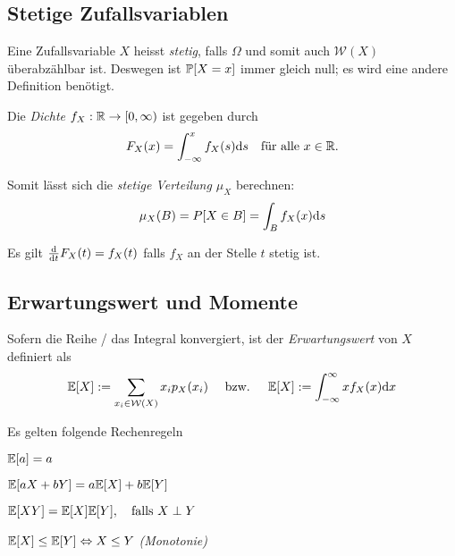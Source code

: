 

\subsection{Stetige Zufallsvariablen}
Eine Zufallsvariable \(X\) heisst \emph{stetig}, falls \(\Omega\) und somit auch \(\mathcal{W}(X)\) überabzählbar ist.
Deswegen ist \(\P[X=x]\) immer gleich null; es wird eine andere Definition benötigt.
\begin{definition}[Dichte]
	Die \emph{Dichte} \(f_X:\R\rightarrow[0,\infty)\) ist gegeben durch
	\[
		F_X(x) = \int_{-\infty}^x f_X(s) \d s
		\quad
		\text{für alle } x \in \R.
	\]
\end{definition}

Somit lässt sich die \emph{stetige Verteilung \(\mu_X\)} berechnen:
\[
	\mu_X(B) = P[X \in B] = \int_{B} f_X(x) \d s
\]

\begin{note}
	Es gilt \(\frac{\d}{\d t} F_X(t) = f_X(t)\) falls \(f_X\) an der Stelle \(t\) stetig ist.
\end{note}



\subsection{Erwartungswert und Momente}

\begin{definition}[Erwartungswert]
	Sofern die Reihe / das Integral konvergiert, ist der \emph{Erwartungswert} von \(X\) definiert als
	\[
		\E[X] := \sum_{x_i \in \mathcal{W}(X)} x_i p_X(x_i)
		\quad	\text{ bzw. }	\quad
		\E[X] := \int_{-\infty}^\infty x f_X(x) \d x
	\]
\end{definition}


\begin{note}
	Es gelten folgende Rechenregeln
	\begin{compactenum}[i:]
		\item \(\E[a] = a\)
		\item \(\E[aX + bY] = a\E[X] + b\E[Y]\)
		\item \(\E[X Y] = \E[X] \E[Y], \quad \text{falls } X \perp Y\)
		\item \(\E[X] \leq \E[Y] \Leftrightarrow X \leq Y\) \emph{(Monotonie)}
	\end{compactenum}
\end{note}


